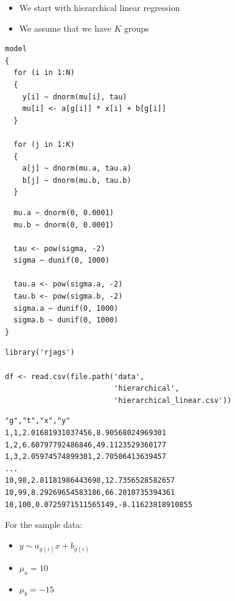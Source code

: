 \documentclass{beamer}
\begin{document}
\begin{frame}
  \begin{itemize}
    \item{We start with hierarchical linear regression}
    \item{We assume that we have $K$ groups}
  \end{itemize}
\end{frame}

\begin{frame}[fragile]
  \begin{verbatim}
model
{
  for (i in 1:N)
  {
    y[i] ~ dnorm(mu[i], tau)
    mu[i] <- a[g[i]] * x[i] + b[g[i]]
  }
  
  for (j in 1:K)
  {
    a[j] ~ dnorm(mu.a, tau.a)
    b[j] ~ dnorm(mu.b, tau.b)
  }
  \end{verbatim}
\end{frame}

\begin{frame}[fragile]
  \begin{verbatim}
  mu.a ~ dnorm(0, 0.0001)
  mu.b ~ dnorm(0, 0.0001)

  tau <- pow(sigma, -2)
  sigma ~ dunif(0, 1000)

  tau.a <- pow(sigma.a, -2)
  tau.b <- pow(sigma.b, -2)
  sigma.a ~ dunif(0, 1000)
  sigma.b ~ dunif(0, 1000)
}
  \end{verbatim}
\end{frame}

\begin{frame}[fragile]
  \begin{verbatim}
library('rjags')

df <- read.csv(file.path('data',
                         'hierarchical',
                         'hierarchical_linear.csv'))
  \end{verbatim}
\end{frame}

\begin{frame}[fragile]
  \begin{verbatim}
"g","t","x","y"
1,1,2.01681931037456,8.90568024969301
1,2,6.60797792486846,49.1123529360177
1,3,2.05974574899301,2.70506413639457
...
10,98,2.81181986443698,12.7356528582657
10,99,8.29269654583186,66.2010735394361
10,100,0.0725971511565149,-8.11623818910855
  \end{verbatim}
\end{frame}

\begin{frame}
  For the sample data:
  \begin{itemize}
    \item{$y \sim a_{g(i)} x + b_{g(i)}$}
    \item{$\mu_a = 10$}
    \item{$\mu_b = -15$}
  \end{itemize}
\end{frame}
\end{document}
